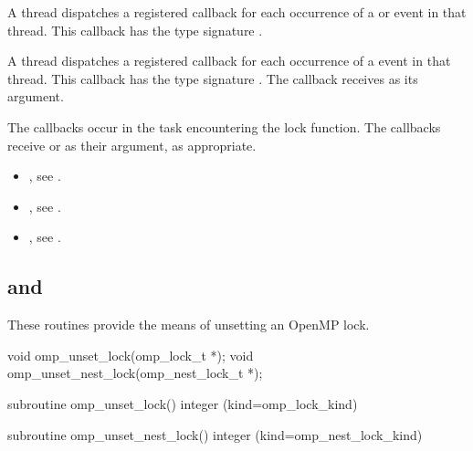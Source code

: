 A thread dispatches a registered 
callback for each occurrence of a  or  event
in that thread.  This callback has the type signature .

A thread dispatches a registered 
callback for each occurrence of a  event
in that thread. This callback has the type signature .
The callback receives  as its  argument.

The callbacks occur in the task encountering
the lock function.  The callbacks receive  or
  as their  argument, as appropriate.


\crossreferences
\begin{itemize}
\item {}, see
.
\item {}, see
.
\item {}, see
.
\end{itemize}




\subsection{ and }
\label{subsec:omp_unset_lock and omp_unset_nest_lock}
\summary
These routines provide the means of unsetting an OpenMP lock.

\format
\begin{ccppspecific}
\begin{ompcFunction}
void omp_unset_lock(omp_lock_t *);
void omp_unset_nest_lock(omp_nest_lock_t *);
\end{ompcFunction}
\end{ccppspecific}


\begin{fortranspecific}
\begin{ompfSubroutine}
subroutine omp_unset_lock()
integer (kind=omp_lock_kind) 

subroutine omp_unset_nest_lock()
integer (kind=omp_nest_lock_kind) 
\end{ompfSubroutine}
\end{fortranspecific}


